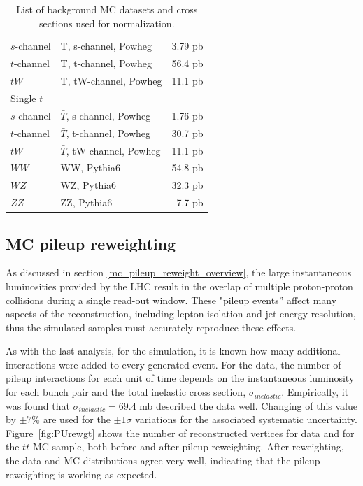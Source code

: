\begin{table}[hbtp]
\begin{tabular}{|p{}|p{}|r|}
$s$-channel & T, s-channel, Powheg & 3.79 pb\\
$t$-channel & T, t-channel, Powheg & 56.4 pb \\
$tW$ & T, tW-channel, Powheg & 11.1 pb \\
\hline
Single $\bar{t}$ & & \\
$s$-channel & $\bar{T}$, s-channel, Powheg & 1.76 pb\\
$t$-channel & $\bar{T}$, t-channel, Powheg & 30.7 pb \\
$tW$ & $\bar{T}$, tW-channel, Powheg & 11.1 pb \\
\hline
$WW$ & WW, Pythia6 & 54.8 pb \\
\hline
$WZ$ & WZ, Pythia6 & 32.3 pb \\
\hline
$ZZ$ & ZZ, Pythia6 & 7.7 pb \\
\hline\hline
\end{tabular}
\caption{List of background MC datasets and cross sections used for normalization.}
\label{tab:bkgSamples}
\end{table}


\subsection{MC pileup reweighting}
\label{mc_pileup_reweight_II_overview}

\par As discussed in section \ref{mc_pileup_reweight_overview}, the
large instantaneous luminosities provided by the LHC result in the
overlap of multiple proton-proton collisions during a single read-out
window.  These "pileup events'' affect many aspects of the
reconstruction, including lepton isolation and jet energy resolution,
thus the simulated samples must accurately reproduce these effects.

\par As with the last analysis, for the simulation, it is known how many
additional interactions were added to every generated event.  For the
data, the number of pileup interactions for each unit of time depends
on the instantaneous luminosity for each bunch pair and the total
inelastic cross section, \(\sigma_{inelastic}\).  Empirically, it was
found that \(\sigma_{inelastic} = 69.4\) mb described the data well.
Changing of this value by \(\pm 7\%\) are used for the $\pm1\sigma$
variations for the associated systematic uncertainty.
Figure~\ref{fig:PUrewgt} shows the number of reconstructed vertices
for data and for the $t\bar{t}$ MC sample, both before and after
pileup reweighting.  After reweighting, the data and MC distributions
agree very well, indicating that the pileup reweighting is working as
expected. 



